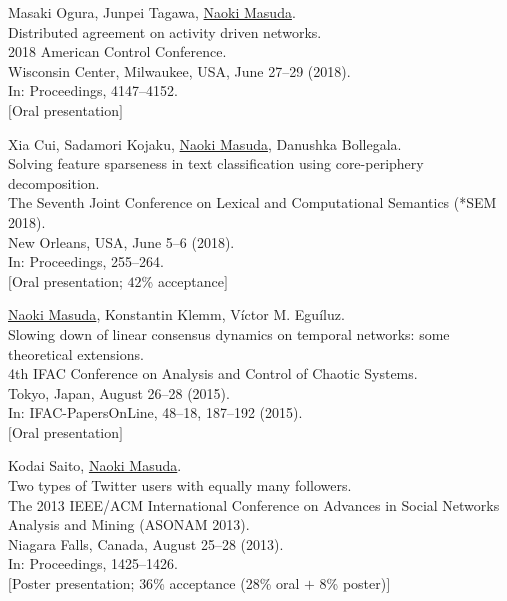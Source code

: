 \documentclass[11pt,letter]{article}
\begin{document}
\begin{etaremune}

\item Masaki Ogura, Junpei Tagawa, \underline{Naoki Masuda}.\\
Distributed agreement on activity driven networks.\\
2018 American Control Conference.\\
Wisconsin Center, Milwaukee, USA, June 27--29 (2018).\\
In: Proceedings, 4147--4152.\\
$[$Oral presentation$]$

\item Xia Cui, Sadamori Kojaku, \underline{Naoki Masuda}, Danushka Bollegala.\\
Solving feature sparseness in text classification using core-periphery decomposition.\\
The Seventh Joint Conference on Lexical and Computational Semantics (*SEM 2018).\\
New Orleans, USA, June 5--6 (2018).\\
In: Proceedings, 255--264.\\
$[$Oral presentation; $42$\% acceptance$]$

\item \underline{Naoki Masuda}, Konstantin Klemm, V\'{i}ctor M. Egu\'{i}luz.\\
Slowing down of linear consensus dynamics on temporal networks: some theoretical extensions.\\
4th IFAC Conference on Analysis and Control of Chaotic Systems.\\
Tokyo, Japan, August 26--28 (2015).\\
In: IFAC-PapersOnLine, 48--18, 187--192 (2015).\\
$[$Oral presentation$]$

\item Kodai Saito, \underline{Naoki Masuda}.\\
Two types of Twitter users with equally many followers.\\
The 2013 IEEE/ACM International Conference on Advances in Social Networks Analysis and Mining (ASONAM 2013).\\
Niagara Falls, Canada, August 25--28 (2013).\\
In: Proceedings, 1425--1426.\\
$[$Poster presentation; $36$\% acceptance (28\% oral $+$ 8\% poster)$]$


\end{etaremune}
\end{document}
